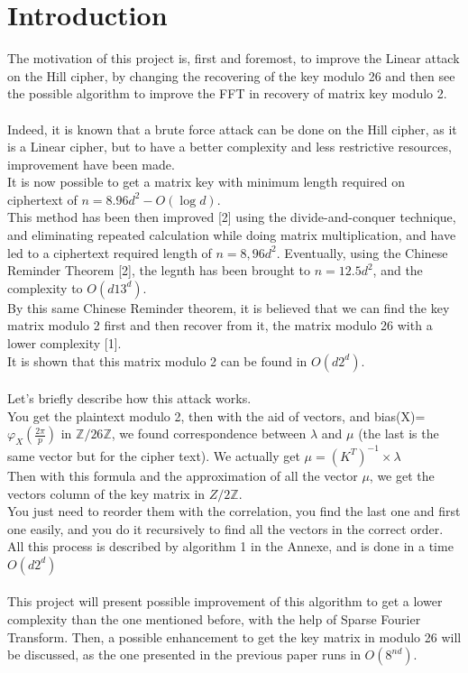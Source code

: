 \documentclass{article}
\begin{document}


\section{Introduction}
The motivation of this project is, first and foremost, to improve the Linear attack on the Hill cipher, by changing the recovering of the key modulo 26 and then see the possible algorithm to improve the FFT in recovery of matrix key modulo 2.\\
\\
Indeed, it is known that a brute force attack can be done on the Hill cipher, as it is a Linear cipher, but to have a better complexity and less restrictive resources, improvement have been made.\\
It is now possible to get a matrix key with minimum length required on ciphertext of $n =8.96d^2 -O(\log d)$.\\
This method has been then improved [2] using the divide-and-conquer technique, and eliminating repeated calculation while doing matrix multiplication, and have led to a ciphertext required length of $n=8,96d^2$. Eventually, using the Chinese Reminder Theorem [2], the legnth has been brought to $n=12.5d^2$, and the complexity to $O(d13^d)$.\\
By this same Chinese Reminder theorem, it is believed that we can find the key matrix modulo 2 first and then recover from it, the matrix modulo 26 with a lower complexity [1].\\
It is shown that this matrix modulo 2 can be found in $O(d2^d)$.\\
\\
Let's briefly describe how this attack works.\\
You get the plaintext modulo 2, then with the aid of vectors, and bias(X)= $\varphi_{X}(\frac{2\pi}{p})$ in $\mathbb{Z}/26\mathbb{Z}$, we found correspondence between $\lambda$ and $\mu$ (the last is the same vector but for the cipher text). We actually get $ \mu = (K^T)^{-1} \times\lambda $\\
Then with this formula and the approximation of all the vector $\mu$, we get the vectors column of the key matrix in ${Z}/2\mathbb{Z}$.\\
You just need to reorder them with the correlation, you find the last one and first one easily, and you do it recursively to find all the vectors in the correct order.\\
All this process is described by algorithm 1 in the Annexe, and is done in a time $O(d 2^d)$\\
\\
This project will present possible improvement of this algorithm to get a lower complexity than the one mentioned before, with the help of Sparse Fourier Transform. Then, a possible enhancement to get the key matrix in modulo 26 will be discussed, as the one presented in the previous paper runs in $O(8^{nd})$.\\
\end{document}
